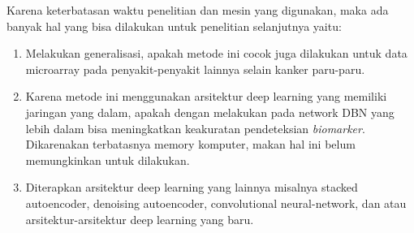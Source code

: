 Karena keterbatasan waktu penelitian dan mesin yang digunakan, maka ada banyak hal yang bisa dilakukan untuk penelitian selanjutnya yaitu: 
\begin{enumerate}
\item Melakukan generalisasi, apakah metode ini cocok juga dilakukan untuk data microarray pada penyakit-penyakit lainnya selain kanker paru-paru.
\item Karena metode ini menggunakan arsitektur deep learning yang memiliki jaringan yang dalam, apakah dengan melakukan pada network DBN yang lebih dalam bisa meningkatkan keakuratan pendeteksian \textit{biomarker}. Dikarenakan terbatasnya memory komputer, makan hal ini belum memungkinkan untuk dilakukan.
\item Diterapkan arsitektur deep learning yang lainnya misalnya stacked autoencoder, denoising autoencoder, convolutional neural-network, dan atau arsitektur-arsitektur deep learning yang baru.
\end{enumerate}

